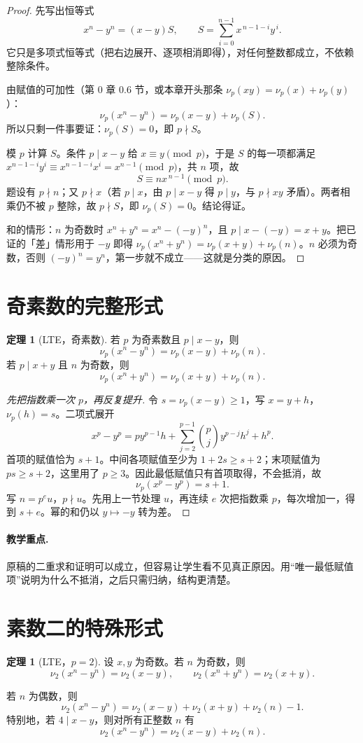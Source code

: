 \documentclass[UTF8,a4paper,11pt,twoside,openright,fontset=fandol]{ctexbook}
\theoremstyle{definition}
\newtheorem{theorem}[definition]{定理}
\begin{document}
\begin{proof}
先写出恒等式
\[
 x^n-y^n=(x-y)S,\qquad S=\sum_{i=0}^{n-1}x^{\,n-1-i}y^{\,i}.
\]
它只是多项式恒等式（把右边展开、逐项相消即得），对任何整数都成立，不依赖整除条件。

由赋值的可加性（第 0 章 0.6 节，或本章开头那条 $\nu_p(xy)=\nu_p(x)+\nu_p(y)$）：
\[
 \nu_p(x^n-y^n)=\nu_p(x-y)+\nu_p(S).
\]
所以只剩一件事要证：$\nu_p(S)=0$，即 $p\nmid S$。

模 $p$ 计算 $S$。条件 $p\mid x-y$ 给 $x\equiv y\pmod p$，于是 $S$ 的每一项都满足 $x^{n-1-i}y^{i}\equiv x^{n-1-i}x^{i}=x^{n-1}\pmod p$，共 $n$ 项，故
\[
 S\equiv n x^{\,n-1}\pmod p.
\]
题设有 $p\nmid n$；又 $p\nmid x$（若 $p\mid x$，由 $p\mid x-y$ 得 $p\mid y$，与 $p\nmid xy$ 矛盾）。两者相乘仍不被 $p$ 整除，故 $p\nmid S$，即 $\nu_p(S)=0$。结论得证。

和的情形：$n$ 为奇数时 $x^n+y^n=x^n-(-y)^n$，且 $p\mid x-(-y)=x+y$。把已证的「差」情形用于 $-y$ 即得
$\nu_p(x^n+y^n)=\nu_p(x+y)+\nu_p(n)$。$n$ 必须为奇数，否则 $(-y)^n=y^n$，第一步就不成立——这就是分类的原因。
\end{proof}

\section{奇素数的完整形式}
\begin{theorem}[LTE，奇素数]
若 $p$ 为奇素数且 $p\mid x-y$，则
\[
 \nu_p(x^n-y^n)=\nu_p(x-y)+\nu_p(n).
\]
若 $p\mid x+y$ 且 $n$ 为奇数，则
\[
 \nu_p(x^n+y^n)=\nu_p(x+y)+\nu_p(n).
\]
\end{theorem}

\begin{proof}[先把指数乘一次 $p$，再反复提升]
令 $s=\nu_p(x-y)\ge1$，写 $x=y+h$，$\nu_p(h)=s$。二项式展开
\[
 x^p-y^p=py^{p-1}h+\sum_{j=2}^{p-1}\binom pj y^{p-j}h^j+h^p.
\]
首项的赋值恰为 $s+1$。中间各项赋值至少为 $1+2s\ge s+2$；末项赋值为 $ps\ge s+2$，这里用了 $p\ge3$。因此最低赋值只有首项取得，不会抵消，故
\[
\nu_p(x^p-y^p)=s+1.
\]
写 $n=p^e u$，$p\nmid u$。先用上一节处理 $u$，再连续 $e$ 次把指数乘 $p$，每次增加一，得到 $s+e$。幂的和仍以 $y\mapsto-y$ 转为差。
\end{proof}
\paragraph{教学重点.} 原稿的二重求和证明可以成立，但容易让学生看不见真正原因。用“唯一最低赋值项”说明为什么不抵消，之后只需归纳，结构更清楚。


\section{素数二的特殊形式}
\begin{theorem}[LTE，$p=2$]
设 $x,y$ 为奇数。若 $n$ 为奇数，则
\[
 \nu_2(x^n-y^n)=\nu_2(x-y),\qquad
 \nu_2(x^n+y^n)=\nu_2(x+y).
\]


若 $n$ 为偶数，则
\[
 \nu_2(x^n-y^n)=\nu_2(x-y)+\nu_2(x+y)+\nu_2(n)-1.
\]
特别地，若 $4\mid x-y$，则对所有正整数 $n$ 有
\[
 \nu_2(x^n-y^n)=\nu_2(x-y)+\nu_2(n).
\]
\end{theorem}
\end{document}
